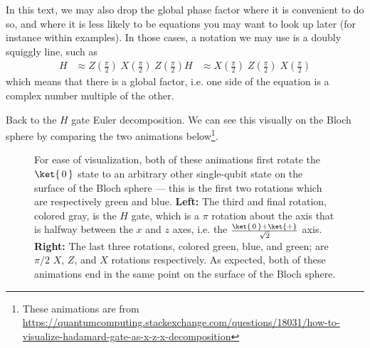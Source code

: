 \documentclass{article}
\theoremstyle{definition}
\newcommand{\kz}[1]{\ket{\,#1\,}}
\newcommand{\kx}[1]{\ket{#1}}
\begin{document}
In this text, we may also drop the global phase factor where it is convenient to do so, and where it is less likely to be equations you may want to look up later (for instance within examples).  In those cases, a notation we may use is a doubly squiggly line, such as
\begin{align}
	H &\approx Z\left(\frac{\pi}{2}\right) \; X\left(\frac{\pi}{2}\right) \; Z\left(\frac{\pi}{2}\right)
	H &\approx X\left(\frac{\pi}{2}\right) \; Z\left(\frac{\pi}{2}\right) \; X\left(\frac{\pi}{2}\right)
\end{align}
which means that there is a global factor, i.e. one side of the equation is a complex number multiple of the other.

Back to the $H$ gate Euler decomposition.  We can see this visually on the Bloch sphere by comparing the two animations below\footnote{These animations are from \url{https://quantumcomputing.stackexchange.com/questions/18031/how-to-visualize-hadamard-gate-as-x-z-x-decomposition}}.
\begin{figure}[H]
\noindent%
\begin{minipage}[t]{0.45\linewidth}
	\begin{frame}{}
	\end{frame}\end{minipage}%
\hfill%
\begin{minipage}[t]{0.45\linewidth}
	\begin{frame}{}
	\end{frame}
\end{minipage}
\caption{For ease of visualization, both of these animations first rotate the $\kz0$ state to an arbitrary other single-qubit state on the surface of the Bloch sphere --- this is the first two rotations which are respectively green and blue.  \textbf{Left:} The third and final rotation, colored gray, is the $H$ gate, which is a $\pi$ rotation about the axis that is halfway between the $x$ and $z$ axes, i.e. the $\frac{\kz0 + \kx+}{\sqrt{2}}$ axis.  \textbf{Right:} The last three rotations, colored green, blue, and green; are $\pi/2$ $X$, $Z$, and $X$ rotations respectively.  As expected, both of these animations end in the same point on the surface of the Bloch sphere.}
\end{figure}


\newpage
\end{document}
